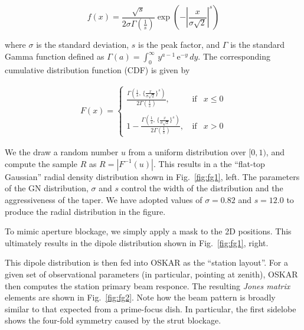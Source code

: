 \documentclass[fleqn,usenatbib]{mnras}
\begin{document}
\begin{equation}   \label{eq:q1}
  f(x) = \frac{\sqrt{s}}{2\sigma\Gamma(\frac{1}{s})}\exp{\left(-\left|\frac{x}{\sigma\sqrt{2}}\right|^s\right)}    
 \end{equation}

\noindent where $\sigma$ is the standard deviation, $s$ is the peak factor, and $\Gamma$ is the standard Gamma function 
defined as $\Gamma(a) = \int_{0}^{\infty}\, y^{a-1}\, \mathrm{e}^{-y}\, dy$. The corresponding cumulative distribution function (CDF) is given by

\begin{eqnarray}   \label{eq:q2} 
 F(x) = \left\{\begin{array}{rcl}
                   \frac{\Gamma\left( \frac{1}{s},\, \{\frac{x}{\sigma \sqrt{2}}\}^s\right)}{2\Gamma(\frac{1}{s})}, & \, \mbox{if} & x \leq 0 \\
                   \\
                  1 -  \frac{\Gamma \left( \frac{1}{s}, \, \{\frac{x}{\sigma\sqrt{2}}\}^s\right)}{2\Gamma(\frac{1}{s})}, & \, \mbox{if} & x > 0
                   \end{array}\right.                   
\end{eqnarray}

We the draw a random number $u$ from a uniform distribution over $[0,1)$, and compute the 
sample $R$ as $R=|F^{-1}(u)|$. This results in a the ``flat-top Gaussian'' radial density distribution shown in Fig.~\ref{fig:fg1}, left. The parameters 
of the GN distribution, $\sigma$ and $s$ control the width of the distribution and the aggressiveness of the taper. We have adopted values of 
$\sigma = 0.82$ and  $s = 12.0$ to produce the radial distribution in the figure.

To mimic aperture blockage, we simply apply a mask to the 2D positions. This ultimately results in the dipole distribution shown in Fig.~\ref{fig:fg1}, right.


This dipole distribution is then fed into OSKAR as the ``station layout''. For a given set of observational parameters (in particular, pointing at zenith), 
OSKAR then computes the station primary beam responce. The resulting \emph{Jones matrix} elements are shown in Fig.~\ref{fig:fg2}. Note how the beam pattern 
is broadly similar to that expected from a prime-focus dish. In particular, the first sidelobe shows the four-fold symmetry caused by the strut blockage.
\end{document}
